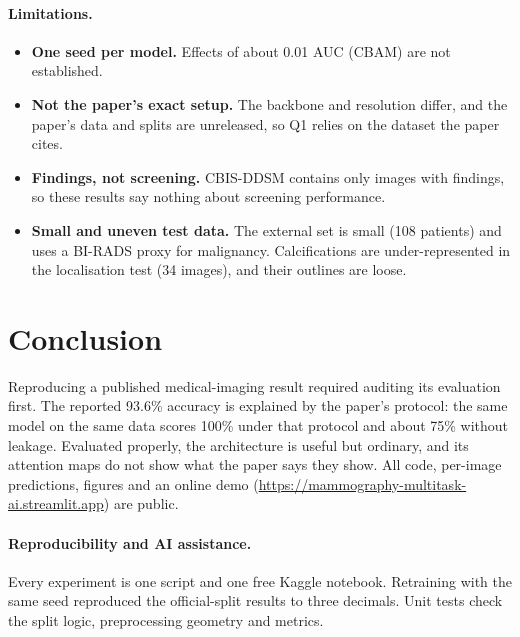 \documentclass[10pt,a4paper]{article}
\begin{document}
\paragraph{Limitations.}
\begin{itemize}
\item \textbf{One seed per model.} Effects of about 0.01 AUC (CBAM) are not established.
\item \textbf{Not the paper's exact setup.} The backbone and resolution differ, and the paper's data and splits are
unreleased, so Q1 relies on the dataset the paper cites.
\item \textbf{Findings, not screening.} CBIS-DDSM contains only images with findings, so these results say nothing
about screening performance.
\item \textbf{Small and uneven test data.} The external set is small (108 patients) and uses a BI-RADS proxy for
malignancy. Calcifications are under-represented in the localisation test (34 images), and their outlines are loose.
\end{itemize}

\section{Conclusion}
Reproducing a published medical-imaging result required auditing its evaluation first. The reported 93.6\%
accuracy is explained by the paper's protocol: the same model on the same data scores 100\% under that protocol and
about 75\% without leakage. Evaluated properly, the architecture is useful but ordinary, and its attention maps do not
show what the paper says they show. All code, per-image predictions, figures and an online demo (\url{https://mammography-multitask-ai.streamlit.app}) are public.

\paragraph{Reproducibility and AI assistance.} Every experiment is one script and one free Kaggle notebook. Retraining
with the same seed reproduced the official-split results to three decimals. Unit tests check the split logic,
preprocessing geometry and metrics. \reportaiuse
\end{document}
